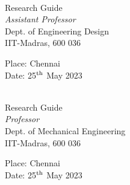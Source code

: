 \documentclass[BTech]{iitmdiss}
\begin{document}
    \begin{paracol}{2}
        \begin{singlespacing}
            \hspace*{-0.25in}
            \parbox{2.5in}{
                 \\
                \noindent Research Guide \\
                \noindent \textit{Assistant Professor} \\
                \noindent Dept. of Engineering Design\\
                \noindent IIT-Madras, 600 036
            }
            \hspace*{1.56in}

            \vspace*{0.3in}
            \noindent Place: Chennai\\
            Date: 25$^{\textnormal{th}}$ May 2023

        \end{singlespacing}

        \switchcolumn
        \begin{singlespacing}
            \hspace*{-0.25in}
            \parbox{2.5in}{
                 \\
                \noindent Research Guide \\
                \noindent \textit{Professor} \\
                \noindent Dept. of Mechanical Engineering\\
                \noindent IIT-Madras, 600 036
            }
            \hspace*{1.56in}

            \vspace*{0.3in}
            \noindent Place: Chennai\\
            Date: 25$^{\textnormal{th}}$ May 2023

        \end{singlespacing}

    \end{paracol}


    \acknowledgements

    \lipsum[1]


\end{document}
